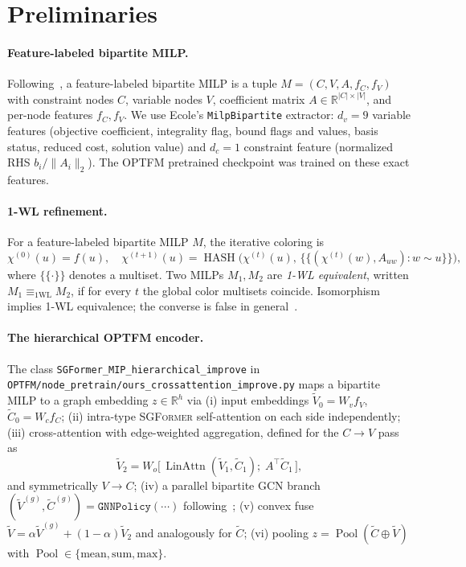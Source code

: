 \documentclass[11pt]{article}
\theoremstyle{plain}
\theoremstyle{definition}
\theoremstyle{remark}
\newcommand{\optfm}{\textsc{OPTFM}}
\newcommand{\sgformer}{\textsc{SGFormer}}
\newcommand{\multiset}[1]{\{\!\!\{#1\}\!\!\}}
\DeclareMathOperator*{\Pool}{Pool}
\DeclareMathOperator*{\HASH}{HASH}
\DeclareMathOperator*{\LinAttn}{LinAttn}
\begin{document}
\section{Preliminaries}
\label{sec:prelim}

\paragraph{Feature-labeled bipartite MILP.}
Following~\cite{gasse2019exact, chen2023expressive}, a feature-labeled
bipartite MILP is a tuple $M = (C, V, A, f_C, f_V)$ with constraint nodes $C$,
variable nodes $V$, coefficient matrix $A \in \mathbb R^{|C|\times|V|}$, and
per-node features $f_C, f_V$. We use Ecole's \texttt{MilpBipartite}
extractor: $d_v=9$ variable features (objective coefficient, integrality
flag, bound flags and values, basis status, reduced cost, solution value)
and $d_c=1$ constraint feature (normalized RHS $b_i / \|A_i\|_2$). The
\optfm{} pretrained checkpoint was trained on these exact features.

\paragraph{1-WL refinement.}
For a feature-labeled bipartite MILP $M$, the iterative coloring is
\begin{equation}\label{eq:wl}
\chi^{(0)}(u) = f(u),\quad \chi^{(t+1)}(u) = \HASH\!\Big(\chi^{(t)}(u),\,
   \multiset{(\chi^{(t)}(w), A_{uw}) : w \sim u}\Big),
\end{equation}
where $\multiset{\cdot}$ denotes a multiset. Two MILPs $M_1, M_2$ are
\emph{1-WL equivalent}, written $M_1 \equiv_{1\text{WL}} M_2$, if for every
$t$ the global color multisets coincide. Isomorphism implies 1-WL
equivalence; the converse is false in general~\cite{cai1992lower}.

\paragraph{The hierarchical \optfm{} encoder.}
The class \texttt{SGFormer\_MIP\_hierarchical\_improve}
in \texttt{OPTFM/node\_pretrain/ours\_crossattention\_improve.py} maps a
bipartite MILP to a graph embedding $z\in\mathbb R^h$ via
(i) input embeddings $\tilde V_0 = W_v f_V$, $\tilde C_0 = W_c f_C$;
(ii) intra-type \sgformer{} self-attention on each side independently;
(iii) cross-attention with edge-weighted aggregation, defined for the $C\to V$
pass as
\begin{equation}\label{eq:cross}
\tilde V_2 = W_o \big[\,\LinAttn(\tilde V_1, \tilde C_1);\;
                          A^\top \tilde C_1\,\big],
\end{equation}
and symmetrically $V\to C$;
(iv) a parallel bipartite GCN branch
$(\tilde V^{(g)},\tilde C^{(g)}) = \texttt{GNNPolicy}(\cdots)$
following~\cite{gasse2019exact};
(v) convex fuse $\tilde V = \alpha \tilde V^{(g)} + (1-\alpha) \tilde V_2$
and analogously for $\tilde C$;
(vi) pooling $z = \Pool(\tilde C \oplus \tilde V)$ with
$\Pool\in\{\text{mean},\text{sum},\text{max}\}$.
\end{document}
